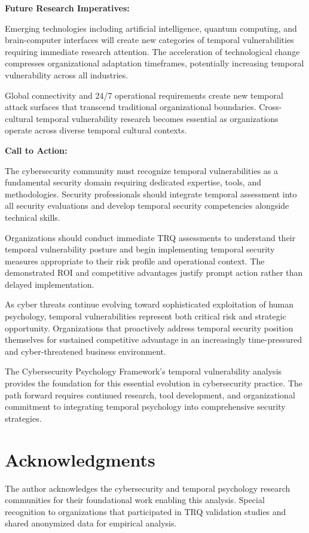 \documentclass[11pt,a4paper]{article}
\begin{document}
\textbf{Future Research Imperatives:}

Emerging technologies including artificial intelligence, quantum computing, and brain-computer interfaces will create new categories of temporal vulnerabilities requiring immediate research attention. The acceleration of technological change compresses organizational adaptation timeframes, potentially increasing temporal vulnerability across all industries.

Global connectivity and 24/7 operational requirements create new temporal attack surfaces that transcend traditional organizational boundaries. Cross-cultural temporal vulnerability research becomes essential as organizations operate across diverse temporal cultural contexts.

\textbf{Call to Action:}

The cybersecurity community must recognize temporal vulnerabilities as a fundamental security domain requiring dedicated expertise, tools, and methodologies. Security professionals should integrate temporal assessment into all security evaluations and develop temporal security competencies alongside technical skills.

Organizations should conduct immediate TRQ assessments to understand their temporal vulnerability posture and begin implementing temporal security measures appropriate to their risk profile and operational context. The demonstrated ROI and competitive advantages justify prompt action rather than delayed implementation.

As cyber threats continue evolving toward sophisticated exploitation of human psychology, temporal vulnerabilities represent both critical risk and strategic opportunity. Organizations that proactively address temporal security position themselves for sustained competitive advantage in an increasingly time-pressured and cyber-threatened business environment.

The Cybersecurity Psychology Framework's temporal vulnerability analysis provides the foundation for this essential evolution in cybersecurity practice. The path forward requires continued research, tool development, and organizational commitment to integrating temporal psychology into comprehensive security strategies.

\section*{Acknowledgments}

The author acknowledges the cybersecurity and temporal psychology research communities for their foundational work enabling this analysis. Special recognition to organizations that participated in TRQ validation studies and shared anonymized data for empirical analysis.
\end{document}
